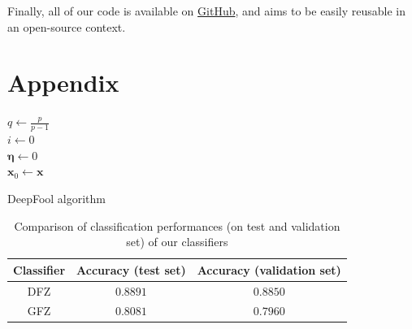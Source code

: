 \documentclass[10pt,twocolumn,letterpaper]{article}
\begin{document}
Finally, all of our code is available on \href{https://github.com/paulbarbier/adversarial-attacks-on-generative-classifiers}{GitHub}, and aims to be easily reusable in an open-source context.

\section{Appendix}
\label{sec:appendix}

\begin{algorithm}
    \SetAlgoLined
        \KwOutput{$\bm{\eta}$}
    $q \leftarrow \frac{p}{p-1}$ \\
    $i \leftarrow 0$ \\
    $\bm{\eta} \leftarrow 0$ \\
    $\bm{x}_0 \leftarrow \bm{x}$ \\
    \caption{DeepFool algorithm}
    \label{algo:deepfool}
\end{algorithm}

\begin{table}[ht]
    \centering
    \begin{tabular}{|c|c|c|}
        \hline
        \textbf{Classifier} & \textbf{Accuracy (test set)} & \textbf{Accuracy (validation set)} \\
        \hline
        DFZ & $0.8891$ & $0.8850$ \\
        \hline
        GFZ & $0.8081$ & $0.7960$ \\
        \hline
    \end{tabular}
    \caption{Comparison of classification performances (on test and validation set) of our classifiers}
    \label{tab:classification_performances}
\end{table}
\end{document}
